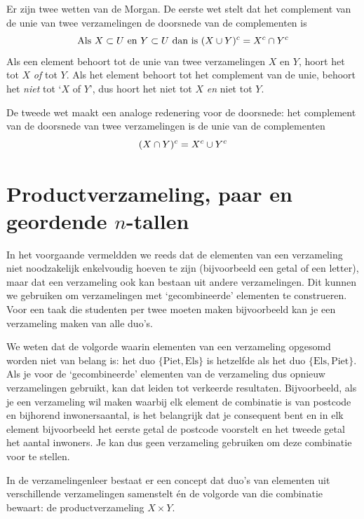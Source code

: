 Er zijn twee wetten van de Morgan. De eerste wet stelt dat het complement van de unie van twee verzamelingen de doorsnede van de complementen is 
\begin{equation*}
\mathrm{Als~}X\subset U \mathrm{~en~} Y\subset U \mathrm{~dan~is~}  (X\cup Y)^c=X^c \cap  Y^c 
\end{equation*}
Als een element behoort tot de unie van twee verzamelingen $X$ en $Y$, hoort het tot $X$ \emph{of} tot $Y$. Als het element behoort tot het complement van de unie, behoort het \emph{niet} tot `$X$ of $Y$', dus hoort het niet tot $X$ \emph{en} niet tot $Y$. 

De tweede wet maakt een analoge redenering voor de doorsnede:  het complement van de doorsnede van twee verzamelingen is de unie van de complementen 
\begin{equation*}
 (X\cap Y)^c=X^c \cup  Y^c
\end{equation*}

\section{Productverzameling, paar en geordende $n$-tallen}\index{\ensuremath{\times}}
\label{sec:prodverz}
In het voorgaande vermeldden we reeds dat de elementen van een verzameling niet noodzakelijk enkelvoudig hoeven te zijn (bijvoorbeeld een getal of een letter), maar dat een verzameling ook kan bestaan uit andere verzamelingen. Dit kunnen we gebruiken om verzamelingen met  `gecombineerde' elementen te construeren. Voor een taak die studenten per twee moeten maken bijvoorbeeld kan je een verzameling maken van alle duo's. 

We weten dat de volgorde waarin elementen van een verzameling opgesomd worden niet van belang is: het duo $\{\mathrm{Piet},\mathrm{Els} \}$ is hetzelfde als het duo $\{\mathrm{Els},\mathrm{Piet} \}$. Als je voor de `gecombineerde' elementen van de verzameling dus opnieuw verzamelingen gebruikt, kan dat leiden tot verkeerde resultaten. Bijvoorbeeld, als je een verzameling wil maken waarbij elk element de combinatie is van postcode en bijhorend inwonersaantal, is het belangrijk dat je consequent bent en in elk element bijvoorbeeld het eerste getal de postcode voorstelt en het tweede getal het aantal inwoners. Je kan dus geen verzameling gebruiken om deze combinatie voor te stellen.  \label{pg:postcodes}

In de verzamelingenleer bestaat er een concept dat duo's van elementen uit verschillende verzamelingen samenstelt \'en de volgorde van die combinatie bewaart: de  productverzameling $X \times Y$. 

